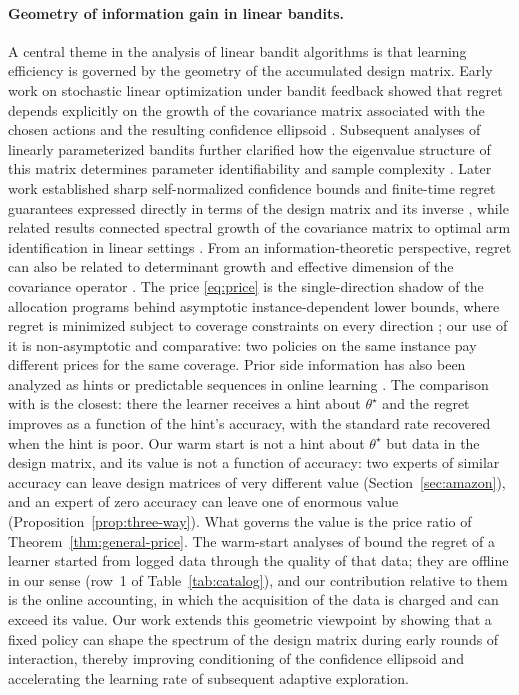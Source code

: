 \documentclass{article}
\theoremstyle{definition}
\theoremstyle{remark}
\theoremstyle{remark}
\begin{document}
\paragraph{Geometry of information gain in linear bandits.}
A central theme in the analysis of linear bandit algorithms is that learning
efficiency is governed by the geometry of the accumulated design matrix.
Early work on stochastic linear optimization under bandit feedback showed
that regret depends explicitly on the growth of the covariance matrix
associated with the chosen actions and the resulting confidence ellipsoid
\cite{dani2008stochastic}. Subsequent analyses of linearly parameterized
bandits further clarified how the eigenvalue structure of this matrix
determines parameter identifiability and sample complexity
\cite{rusmevichientong2010linearly}. Later work established sharp
self-normalized confidence bounds and finite-time regret guarantees
expressed directly in terms of the design matrix and its inverse
\cite{abbasi2011improved}, while related results connected spectral growth
of the covariance matrix to optimal arm identification in linear settings
\cite{soare2014best}. From an information-theoretic perspective, regret can
also be related to determinant growth and effective dimension of the
covariance operator \cite{srinivas2012information,valko2013finite}. The
price \eqref{eq:price} is the single-direction shadow of the allocation
programs behind asymptotic instance-dependent lower bounds, where regret is
minimized subject to coverage constraints on every direction
\cite{graves1997asymptotically,lattimore2017end}; our use of it is
non-asymptotic and comparative: two policies on the same instance pay
different prices for the same coverage. Prior side information has also been
analyzed as hints or predictable sequences in online learning
\cite{rakhlin2013online,cutkosky2022leveraging}. The comparison with
\cite{cutkosky2022leveraging} is the closest: there the learner receives a
hint about $\theta^\star$ and the regret improves as a function of the hint's
accuracy, with the standard rate recovered when the hint is poor. Our warm
start is not a hint about $\theta^\star$ but data in the design matrix, and
its value is not a function of accuracy: two experts of similar accuracy can
leave design matrices of very different value (Section~\ref{sec:amazon}),
and an expert of zero accuracy can leave one of enormous value
(Proposition~\ref{prop:three-way}). What governs the value is the price ratio
of Theorem~\ref{thm:general-price}. The warm-start analyses of
\cite{bastani2021mostly,zhang2019warm} bound the regret of a learner started
from logged data through the quality of that data; they are offline in our
sense (row~1 of Table~\ref{tab:catalog}), and our contribution relative to
them is the online accounting, in which the acquisition of the data is
charged and can exceed its value. Our
work extends this geometric viewpoint by showing that a fixed policy can
shape the spectrum of the design matrix during early rounds of interaction,
thereby improving conditioning of the confidence ellipsoid and accelerating
the learning rate of subsequent adaptive exploration.
\end{document}
